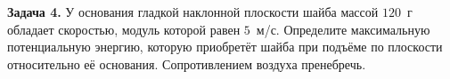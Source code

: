 \begin{taskbasic}[code={\label{task:energy_v8_n3}}]
\textbf{Задача 4.} У основания гладкой наклонной плоскости шайба массой $120$~г обладает скоростью, модуль которой равен $5$~м/с. Определите максимальную потенциальную энергию, которую приобретёт шайба при подъёме по плоскости относительно её основания. Сопротивлением воздуха пренебречь.

\end{taskbasic}
